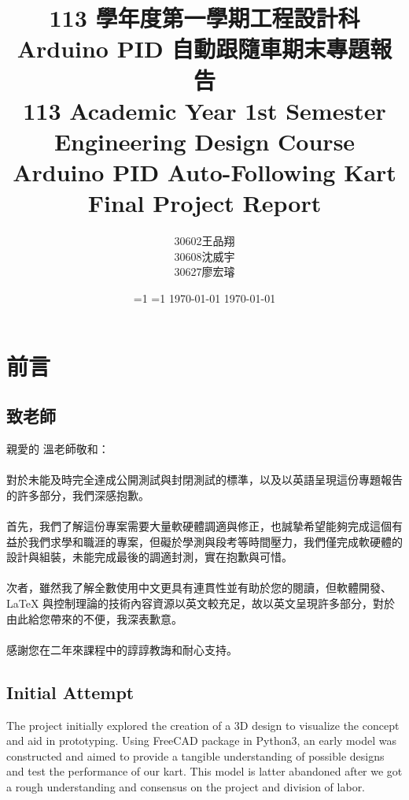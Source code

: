 \documentclass[a4paper,12pt]{article}
\newcounter{xeCJK}
\newcounter{ZhRenew}
\renewcommand{\maketitle}{
\begin{titlepage}
\begin{center}
\vspace*{\fill}
{\huge \bfseries \thetitle\par}
\vskip 1.5em
{\Large \theauthor\par}
\vskip 1em
{\large \thedate\par}
\vspace*{\fill}
\end{center}
\end{titlepage}
}
\begin{document}
\title{
\Large 113 學年度第一學期工程設計科\\
\huge Arduino PID 自動跟隨車期末專題報告\\
\Large 113 Academic Year 1st Semester Engineering Design Course\\
\huge Arduino PID Auto-Following Kart Final Project Report
}
\author{30602王品翔\\30608沈威宇\\30627廖宏璿}
\date{
\ifnum\value{xeCJK}=1
\ifnum\value{ZhRenew}=1
\zhtoday
\else\today
\fi
\else
\today
\fi
}
\onehalfspacing
\thispagestyle{empty}\nth\maketitle\setcounter{page}{1}
\nth\tableofcontents
\nthm\setcounter{page}{1}
\section{前言}
\subsection{致老師}
親愛的 溫老師敬和：\\\\
對於未能及時完全達成公開測試與封閉測試的標準，以及以英語呈現這份專題報告的許多部分，我們深感抱歉。\\\\
首先，我們了解這份專案需要大量軟硬體調適與修正，也誠摯希望能夠完成這個有益於我們求學和職涯的專案，但礙於學測與段考等時間壓力，我們僅完成軟硬體的設計與組裝，未能完成最後的調適封測，實在抱歉與可惜。\\\\
次者，雖然我了解全數使用中文更具有連貫性並有助於您的閱讀，但軟體開發、\LaTeX{} 與控制理論的技術內容資源以英文較充足，故以英文呈現許多部分，對於由此給您帶來的不便，我深表歉意。\\\\
感謝您在二年來課程中的諄諄教誨和耐心支持。
\subsection{Initial Attempt}
The project initially explored the creation of a 3D design to visualize the concept and aid in prototyping. Using FreeCAD package in Python3, an early model was constructed and aimed to provide a tangible understanding of possible designs and test the performance of our kart. This model is latter abandoned after we got a rough understanding and consensus on the project and division of labor.
\end{document}
